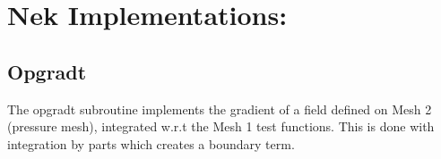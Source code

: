 \documentclass{kthreport}
\begin{document}


\section{Nek Implementations:}

\subsection{Opgradt}

The opgradt subroutine implements the gradient of a field defined on Mesh 2 (pressure mesh), integrated w.r.t the Mesh 1 test functions.
This is done with integration by parts which creates a boundary term.
\end{document}
